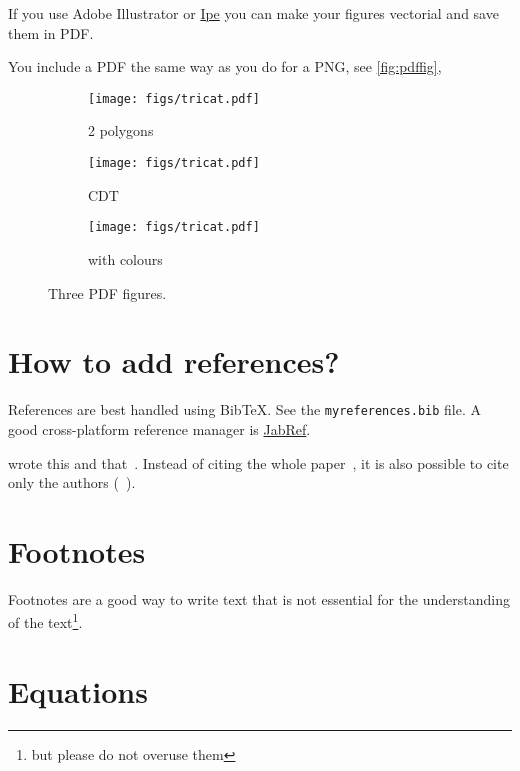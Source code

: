If you use Adobe Illustrator or \href{http://ipe7.sourceforge.net}{Ipe} you can make your figures vectorial and save them in PDF\@.

You include a PDF the same way as you do for a PNG, see \autoref{fig:pdffig},
\begin{figure}
  \centering
  \begin{subfigure}[b]{0.28\linewidth}
    \centering
    \texttt{[image: figs/tricat.pdf]}
    \caption{2 polygons}\label{fig:pdffig:1}
  \end{subfigure}%
  \qquad %
  \begin{subfigure}[b]{0.28\linewidth}
    \centering
    \texttt{[image: figs/tricat.pdf]}
    \caption{CDT }\label{fig:pdffig:2}
  \end{subfigure}%
  \qquad %
  \begin{subfigure}[b]{0.28\linewidth}
    \centering
    \texttt{[image: figs/tricat.pdf]}
    \caption{with colours}\label{fig:pdffig:3}
  \end{subfigure}%
  \caption{Three PDF figures.}%
\label{fig:pdffig}
\end{figure}


%
\section{How to add references?}

References are best handled using Bib\TeX.
See the \texttt{myreferences.bib} file. 
A good cross-platform reference manager is \href{http://jabref.sourceforge.net/}{JabRef}.

\citet{Descartes37} wrote this and that~\citep{Voronoi08,Delaunay34}.
Instead of citing the whole paper~\citep{Delaunay34}, it is also possible to cite only the authors (\eg\ \citeauthor{Delaunay34}).

%
\section{Footnotes}

Footnotes are a good way to write text that is not essential for the understanding of the text\footnote{but please do not overuse them}.

%
\section{Equations}

